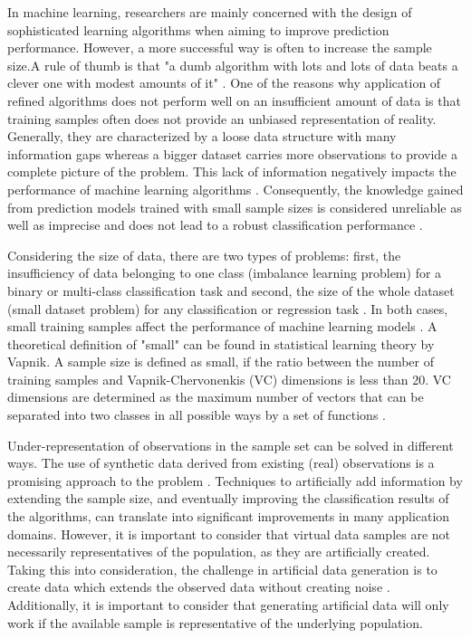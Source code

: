 \documentclass[parskip=full]{scrartcl}
\begin{document}
In machine learning, researchers are mainly concerned with the design of sophisticated learning 
algorithms when aiming to improve prediction performance. However, a more successful way is often 
to increase the sample size.A rule of thumb is that "a dumb algorithm with lots and lots of data beats a 
clever one with modest amounts of it" \cite{Domingos.2012}. One of the reasons why application of 
refined algorithms does not perform well on an insufficient amount of data is that training samples 
often does not provide an unbiased representation of reality. Generally, they are characterized by a 
loose data structure with many information gaps whereas a bigger dataset carries more observations 
to provide a complete picture of the problem. This lack of information negatively impacts the 
performance of machine learning algorithms \cite{Lin.2018}. Consequently, the knowledge gained from 
prediction models trained with small sample sizes is considered unreliable as well as imprecise and does 
not lead to a robust classification performance 
\cite{AbdulLateh.2017}.

Considering the size of data, there are two types of problems: first, the  insufficiency of data belonging 
to one class (imbalance learning problem) for a binary or multi-class classification task and second, the 
size of the whole dataset (small dataset problem) for any classification or regression task 
\cite{Sezer.2014}. In both cases, small training samples affect the performance of machine learning 
models \cite{Tsai.2008}. A theoretical definition of "small" can be found in statistical learning theory by 
Vapnik. A sample size is defined as small, if the ratio between the number of training samples and 
Vapnik-Chervonenkis (VC) dimensions is less than 20. VC dimensions are determined as the maximum 
number of vectors that can be separated into two classes in all possible ways by a set of functions 
\cite{Vapnik.2008}.

Under-representation of observations in the sample set can be solved in different ways. The use of 
synthetic data derived from existing (real) observations is a promising approach to the problem 
\cite{Sezer.2014}. Techniques to artificially add information by extending the sample size, and 
eventually improving the classification results of the algorithms, can translate into significant 
improvements in many application domains. However, it is important to consider that virtual data 
samples are not necessarily representatives of the population, as they are artificially created. Taking 
this into consideration, the challenge in artificial data generation is to create data which extends the 
observed data without creating noise \cite{Li.2006}. Additionally, it is important to consider that 
generating artificial data will only work if the available sample is representative of the underlying 
population.
\end{document}
